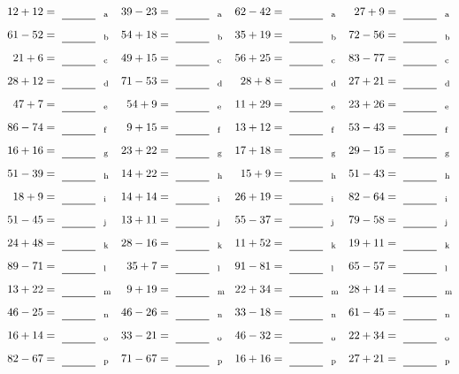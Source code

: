 \documentclass
[
  draft    = true,
  fontsize = 11pt,
  parskip  = half-
]
{scrartcl}
\begin{document}
\clearpage
\begin{align*}
    \pline{12+12}&=\rline{a}
  & \pline{39-23}&=\rline{a}
  & \pline{62-42}&=\rline{a}
  & \pline{27+9}&=\rline{a} \\[1ex]
    \pline{61-52}&=\rline{b}
  & \pline{54+18}&=\rline{b}
  & \pline{35+19}&=\rline{b}
  & \pline{72-56}&=\rline{b} \\[1ex]
    \pline{21+6}&=\rline{c}
  & \pline{49+15}&=\rline{c}
  & \pline{56+25}&=\rline{c}
  & \pline{83-77}&=\rline{c} \\[1ex]
    \pline{28+12}&=\rline{d}
  & \pline{71-53}&=\rline{d}
  & \pline{28+8}&=\rline{d}
  & \pline{27+21}&=\rline{d} \\[1ex]
    \pline{47+7}&=\rline{e}
  & \pline{54+9}&=\rline{e}
  & \pline{11+29}&=\rline{e}
  & \pline{23+26}&=\rline{e} \\[1ex]
    \pline{86-74}&=\rline{f}
  & \pline{9+15}&=\rline{f}
  & \pline{13+12}&=\rline{f}
  & \pline{53-43}&=\rline{f} \\[1ex]
    \pline{16+16}&=\rline{g}
  & \pline{23+22}&=\rline{g}
  & \pline{17+18}&=\rline{g}
  & \pline{29-15}&=\rline{g} \\[1ex]
    \pline{51-39}&=\rline{h}
  & \pline{14+22}&=\rline{h}
  & \pline{15+9}&=\rline{h}
  & \pline{51-43}&=\rline{h} \\[1ex]
    \pline{18+9}&=\rline{i}
  & \pline{14+14}&=\rline{i}
  & \pline{26+19}&=\rline{i}
  & \pline{82-64}&=\rline{i} \\[1ex]
    \pline{51-45}&=\rline{j}
  & \pline{13+11}&=\rline{j}
  & \pline{55-37}&=\rline{j}
  & \pline{79-58}&=\rline{j} \\[1ex]
    \pline{24+48}&=\rline{k}
  & \pline{28-16}&=\rline{k}
  & \pline{11+52}&=\rline{k}
  & \pline{19+11}&=\rline{k} \\[1ex]
    \pline{89-71}&=\rline{l}
  & \pline{35+7}&=\rline{l}
  & \pline{91-81}&=\rline{l}
  & \pline{65-57}&=\rline{l} \\[1ex]
    \pline{13+22}&=\rline{m}
  & \pline{9+19}&=\rline{m}
  & \pline{22+34}&=\rline{m}
  & \pline{28+14}&=\rline{m} \\[1ex]
    \pline{46-25}&=\rline{n}
  & \pline{46-26}&=\rline{n}
  & \pline{33-18}&=\rline{n}
  & \pline{61-45}&=\rline{n} \\[1ex]
    \pline{16+14}&=\rline{o}
  & \pline{33-21}&=\rline{o}
  & \pline{46-32}&=\rline{o}
  & \pline{22+34}&=\rline{o} \\[1ex]
    \pline{82-67}&=\rline{p}
  & \pline{71-67}&=\rline{p}
  & \pline{16+16}&=\rline{p}
  & \pline{27+21}&=\rline{p}
\end{align*}
\end{document}
